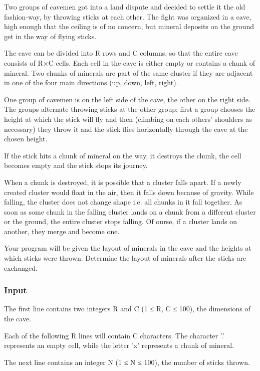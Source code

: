 



   Two groups of cavemen got into a land dispute and decided to settle it the old fashion-way, by throwing sticks at each other. The fight was organized in a cave, high enough that the ceiling is of no concern, but mineral deposits on the ground get in the way of flying sticks.  

   The cave can be divided into R rows and C columns, so that the entire cave consists of R×C cells. Each cell in the cave is either empty or contains a chunk of mineral. Two chunks of minerals are part of the same cluster if they are adjacent in one of the four main directions (up, down, left, right).  

   One group of cavemen is on the left side of the cave, the other on the right side. The groups alternate throwing sticks at the other group; first a group chooses the height at which the stick will fly and then (climbing on each others' shoulders as necessary) they throw it and the stick flies horizontally through the cave at the chosen height.  

   If the stick hits a chunk of mineral on the way, it destroys the chunk, the cell becomes empty and the stick stops its journey.  

   When a chunk is destroyed, it is possible that a cluster falls apart. If a newly created cluster would float in the air, then it falls down because of gravity. While falling, the cluster does not change shape i.e. all chunks in it fall together. As soon as some chunk in the falling cluster lands on a chunk from a different cluster or the ground, the entire cluster stops falling. Of  ourse, if a cluster lands on another, they merge and become one.  

   Your program will be given the layout of minerals in the cave and the heights at which sticks were thrown. Determine the layout of minerals after the sticks are exchanged.  

\subsubsection{   Input  }

   The first line contains two integers R and C (1 ≤ R, C ≤ 100), the dimensions of the cave.  

   Each of the following R lines will contain C characters. The character '.' represents an empty cell, while the letter 'x' represents a chunk of mineral.  

   The next line contains an integer N (1 ≤ N ≤ 100), the number of sticks thrown.  

